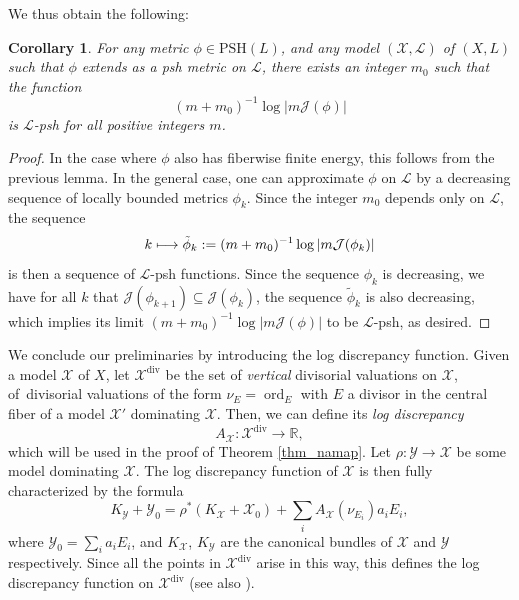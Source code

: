 \documentclass[JEP,XML,SOM,Unicode,NoEqCountersInSection,published]{cedram}
\def\mto{\mathchoice{\longmapsto}{\mapsto}{\mapsto}{\mapsto}}
\newtheorem{corollary}[theorem]{Corollary}
\theoremstyle{definition}
\newcommand\bbr{\mathbb{R}}
\newcommand\cJ{\mathcal{J}}
\newcommand\cL{\mathcal{L}}
\newcommand\cX{\mathcal{X}}
\newcommand\cY{\mathcal{Y}}
\newcommand\mi{^{-1}}
\DeclareMathOperator{\ord}{ord}
\newcommand\PSH{\mathrm{PSH}}
\begin{document}
We thus obtain the following:
\begin{corollary}\label{cor_multidealvertical}For any metric $\phi\in\PSH(L)$, and any model $(\cX,\cL)$ of $(X,L)$ such that $\phi$ extends as a psh metric on $\cL$, there exists an integer $m_0$ such that the function
\[
(m+m_0)\mi\log |m\cJ(\phi)|
\]
is $\cL$-psh for all positive integers $m$.
\end{corollary}
\begin{proof}In the case where $\phi$ also has fiberwise finite energy, this follows from the previous lemma. In the general case, one can approximate $\phi$ on $\cL$ by a decreasing sequence of locally bounded metrics $\phi_k$. Since the integer $m_0$ depends only on $\cL$, the sequence
\[
k\mto \tilde\phi_k:=(m+m_0)\mi\log |m\cJ(\phi_k)|
\]
is then a sequence of $\cL$-psh functions. Since the sequence $\phi_k$ is decreasing, we have for all $k$ that $\cJ(\phi_{k+1})\subseteq \cJ(\phi_k)$, \ie the sequence $\tilde\phi_k$ is also decreasing, which implies its limit $(m+m_0)\mi\log |m\cJ(\phi)|$ to be $\cL$-psh, as desired.
\end{proof}

We conclude our preliminaries by introducing the log discrepancy function. Given a model $\cX$ of $X$, let $\cX^{\mathrm{div}}$ be the set of \textit{vertical} divisorial valuations on $\cX$, \ie of~divisorial valuations of the form $\nu_E=\ord_E$ with $E$ a divisor in the central fiber of a model $\cX'$ dominating $\cX$. Then, we can define its \textit{log discrepancy}
\[
A_\cX:\cX^{\mathrm{div}}\to \bbr,
\]
which will be used in the proof of Theorem \ref{thm_namap}. Let $\rho:\cY\to\cX$ be some model dominating $\cX$. The log discrepancy function of $\cX$ is then fully characterized by the formula
\[
K_{\cY}+\cY_0 = \rho^*(K_\cX + \cX_0) + \sum_i A_\cX(\nu_{E_i})a_i E_i,
\]
where $\cY_0=\sum_i a_i E_i$, and $K_\cX$, $K_\cY$ are the canonical bundles of $\cX$ and $\cY$ respectively. Since all the points in $\cX^{\mathrm{div}}$ arise in this way, this defines the log discrepancy function on $\cX^{\mathrm{div}}$ (see also \cite[\S 5.4]{bjtrop}).
\end{document}
